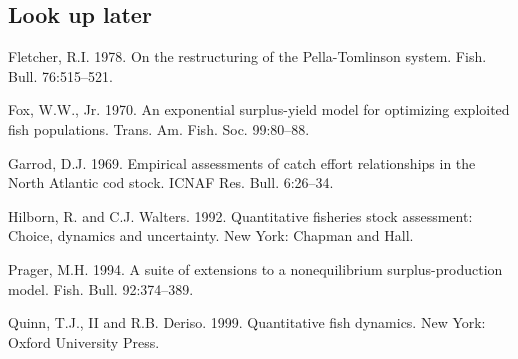\documentclass[fleqn]{article}
\begin{document}
\subsection{Look up later}
\small\sloppy\frenchspacing\setlength{\hyphenpenalty}{1000}
\begin{description}
  \item Fletcher, R.I. 1978. On the restructuring of the Pella-Tomlinson system.
  Fish. Bull. 76:515--521.

  \item Fox, W.W., Jr. 1970. An exponential surplus-yield model for optimizing
  exploited fish populations. Trans. Am. Fish. Soc. 99:80--88.

  \item Garrod, D.J. 1969. Empirical assessments of catch effort relationships
  in the North Atlantic cod stock. ICNAF Res. Bull. 6:26--34.

  \item Hilborn, R. and C.J. Walters. 1992. Quantitative fisheries stock
  assessment: Choice, dynamics and uncertainty. New York: Chapman and Hall.

  \item Prager, M.H. 1994. A suite of extensions to a nonequilibrium
  surplus-production model. Fish. Bull. 92:374--389.

  \item Quinn, T.J., II and R.B. Deriso. 1999. Quantitative fish dynamics. New
  York: Oxford University Press.
\end{description}
\end{document}
